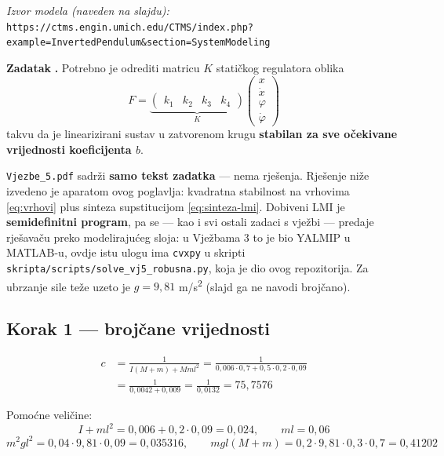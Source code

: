 \begin{zadatak}
\emph{Izvor modela (naveden na slajdu):}\\
{\small\texttt{https://ctms.engin.umich.edu/CTMS/index.php?}\\
\texttt{example=InvertedPendulum\&section=SystemModeling}}

\textbf{Zadatak} \textbf{.} Potrebno je odrediti matricu $K$
statičkog regulatora oblika
\[
F = \underbrace{\begin{pmatrix}k_1 & k_2 & k_3 & k_4\end{pmatrix}}_{K}
\begin{pmatrix}x\\ \dot x\\ \varphi\\ \dot\varphi\end{pmatrix}
\]
takvu da je linearizirani sustav u zatvorenom krugu \textbf{stabilan za sve
očekivane vrijednosti koeficijenta $b$}.

\begin{napomena}
\texttt{Vjezbe\_5.pdf} sadrži \textbf{samo tekst zadatka} --- nema rješenja.
Rješenje niže izvedeno je aparatom ovog poglavlja: kvadratna stabilnost na
vrhovima \eqref{eq:vrhovi} plus sinteza supstitucijom \eqref{eq:sinteza-lmi}.
Dobiveni LMI je \textbf{semidefinitni program}, pa se --- kao i svi ostali
zadaci s vježbi --- predaje rješavaču preko modelirajućeg sloja: u Vježbama 3
to je bio YALMIP u MATLAB-u, ovdje istu ulogu ima \texttt{cvxpy} u skripti
\texttt{skripta/scripts/solve\_vj5\_robusna.py}, koja je dio ovog
repozitorija. Za ubrzanje sile teže uzeto je $g = 9{,}81$
m/s\textsuperscript{2} (slajd ga ne navodi brojčano).
\end{napomena}

\subsection*{Korak 1 --- brojčane vrijednosti}

\begin{align*}
c &= \frac{1}{I(M+m) + Mml^2}
   = \frac{1}{0{,}006\cdot0{,}7 + 0{,}5\cdot0{,}2\cdot0{,}09} \\
  &= \frac{1}{0{,}0042 + 0{,}009}
   = \frac{1}{0{,}0132} = 75{,}7576
\end{align*}

Pomoćne veličine:
\[
I + ml^2 = 0{,}006 + 0{,}2\cdot0{,}09 = 0{,}024, \qquad
ml = 0{,}06
\]
\[
m^2gl^2 = 0{,}04\cdot9{,}81\cdot0{,}09 = 0{,}035316, \qquad
mgl(M+m) = 0{,}2\cdot9{,}81\cdot0{,}3\cdot0{,}7 = 0{,}41202
\]


\end{zadatak}
